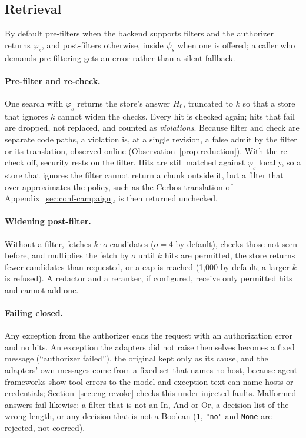 \subsection{Retrieval}\label{sec:sys-retrieval}

By default \sys{} pre-filters when the backend supports filters and the authorizer returns
$\varphi_s$, and post-filters otherwise, inside $\psi_s$ when one is offered; a caller who demands
pre-filtering gets an error rather than a silent fallback.

\paragraph{Pre-filter and re-check.}
One search with $\varphi_s$ returns the store's answer $H_0$, truncated to $k$ so that a store that
ignores $k$ cannot widen the checks. Every hit is checked again; hits that fail are dropped, not
replaced, and counted as \emph{violations}. Because filter and check are separate code paths, a
violation is, at a single revision, a false admit by the filter or its translation, observed online
(Observation~\ref{prop:reduction}). With the re-check off, security rests on the filter. Hits are
still matched against $\varphi_s$ locally, so a store that ignores the filter cannot return a chunk
outside it, but a filter that over-approximates the policy, such as the Cerbos translation of
Appendix~\ref{sec:conf-campaign}, is then returned unchecked.

\paragraph{Widening post-filter.}
Without a filter, \sys{} fetches $k \cdot o$ candidates ($o = 4$ by default), checks those not seen
before, and multiplies the fetch by $o$ until $k$ hits are permitted, the store returns fewer
candidates than requested, or a cap is reached (1,000 by default; a larger $k$ is refused). A
redactor and a reranker, if configured, receive only permitted hits and cannot add one.

\paragraph{Failing closed.}
Any exception from the authorizer ends the request with an authorization error and no hits. An
exception the adapters did not raise themselves becomes a fixed message (``authorizer failed''), the
original kept only as its cause, and the adapters' own messages come from a fixed set that names no
host, because agent frameworks show tool errors to the model and exception text can name hosts or
credentials; Section~\ref{sec:eng-revoke} checks this under injected faults.
Malformed answers fail likewise: a filter that is not an In, And or Or, a decision list of the wrong
length, or any decision that is not a Boolean (\texttt{1}, \texttt{"no"} and \texttt{None} are
rejected, not coerced).

